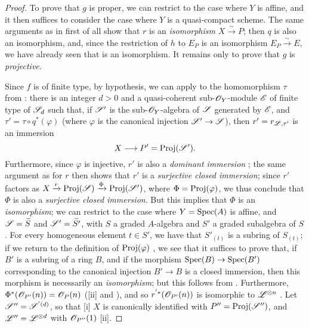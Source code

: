 \begin{proof}
To prove that $g$ is proper, we can restrict to the case where $Y$ is affine, and it then suffices to consider the case where $Y$ is a quasi-compact scheme.
The same arguments as in  first of all show that $r$ is an \emph{isomorphism} $X\xrightarrow{\sim}P$;
then $q$ is also an isomorphism, and, since the restriction of $h$ to $E_P$ is an isomorphism $E_P\xrightarrow{\sim}E$, we have already seen that  is an isomorphism.
It remains only to prove that $g$ is \emph{projective}.

Since $f$ is of finite type, by hypothesis, we can apply  to the homomorphism
$\tau$ from :
there is an integer $d>0$ and a quasi-coherent sub-$\mathscr{O}_Y$-module $\mathscr{E}$ of finite type of $\mathscr{S}_d$ such that, if $\mathscr{S}'$ is the sub-$\mathscr{O}_Y$-algebra of $\mathscr{S}$ generated by $\mathscr{E}$, and $\tau'=\tau\circ q^*(\varphi)$ (where $\varphi$ is the canonical injection $\sh{S}'\to\sh{S}$), then $r'=r_{\mathscr{L},\tau'}$ is an immersion
\[
  X \to P' = \Proj(\sh{S}').
\]
Furthermore, since $\varphi$ is injective, $r'$ is also a \emph{dominant immersion} ;
the same argument as for $r$ then shows that $r'$ is a \emph{surjective closed immersion};
since $r'$ factors as $X\xrightarrow{r}\operatorname{Proj}(\mathscr{S})\xrightarrow{\Phi}\operatorname{Proj}(\mathscr{S}')$, where $\Phi=\operatorname{Proj}(\varphi)$, we thus conclude that $\Phi$ is also a \emph{surjective closed immersion}.
But this implies that $\Phi$ is an \emph{isomorphism};
we can restrict to the case where $Y=\operatorname{Spec}(A)$ is affine, and $\mathscr{S}=\widetilde{S}$ and $\mathscr{S}'=\widetilde{S'}$, with $S$ a graded $A$-algebra and $S'$ a graded subalgebra of $S$.
For every homogeneous element $t\in S'$, we have that $S'_{(t)}$ is a subring of $S_{(t)}$;
if we return to the definition of $\operatorname{Proj}(\varphi)$ , we see that it suffices to prove that, if $B'$ is a subring of a ring $B$, and if the morphism $\Spec(B)\to\Spec(B')$ corresponding to the canonical injection $B'\to B$ is a closed immersion, then this morphism is necessarily an \emph{isomorphism};
but this follows from .
Furthermore, $\Phi^*(\mathscr{O}_{P'}(n))=\mathscr{O}_P(n)$ ([ii] and ), and so $r^{'*}(\mathscr{O}_{P'}(n))$ is isomorphic to $\mathscr{L}^{\otimes n}$ .
Let $\mathscr{S}''=\mathscr{S}^{'(d)}$, so that [i] $X$ is canonically identified with $P''=\operatorname{Proj}(\mathscr{S}'')$, and $\mathscr{L}''=\mathscr{L}^{\otimes d}$ with $\mathscr{O}_{P''}(1)$ [ii].


\end{proof}
